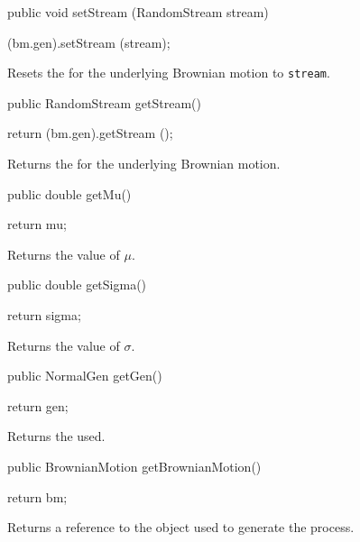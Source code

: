 \begin{code}

   public void setStream (RandomStream stream) \begin{hide} { (bm.gen).setStream (stream); }\end{hide}
\end{code}
\begin{tabb} 
Resets the  
for the underlying Brownian motion to \texttt{stream}.
\end{tabb}
\begin{code}

   public RandomStream getStream() \begin{hide} { return (bm.gen).getStream (); }\end{hide}
\end{code}
\begin{tabb} 
Returns the 
for the underlying Brownian motion.
\end{tabb}
\begin{code}

   public double getMu() \begin{hide} { return mu; }\end{hide}
\end{code}
\begin{tabb} Returns the value of $\mu$.
\end{tabb}
\begin{code}

   public double getSigma() \begin{hide} { return sigma; }\end{hide}
\end{code}
\begin{tabb} Returns the value of $\sigma$. 
\end{tabb}
\begin{code}

   public NormalGen getGen() \begin{hide} { return gen; }\end{hide}
\end{code}
\begin{tabb} 
Returns the  used.
\end{tabb}
\begin{code}

   public BrownianMotion getBrownianMotion() \begin{hide} { 
        return bm;
    }\end{hide}
\end{code}
\begin{tabb} Returns a reference to the  object
used to generate the process.
\end{tabb}

\begin{code} \begin{hide}

    protected void init() {
        super.init();   // Maybe useless...
    }

}
\end{hide}\end{code}
